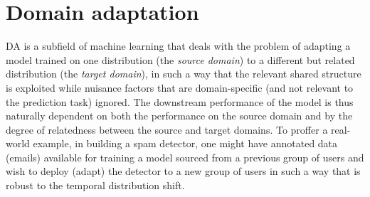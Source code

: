 \section{Domain adaptation}\label{sec:domain-adaptation}
\Acf{DA} is a subfield of machine learning that deals with the problem of adapting a model trained
on one distribution (the \emph{source domain}) to a different but related distribution (the
\emph{target domain}), in such a way that the relevant shared structure is exploited while nuisance
factors that are domain-specific (and not relevant to the prediction task) ignored.
%
The downstream performance of the  model is thus naturally dependent on both the performance on the
source domain and by the degree of relatedness between the source and target domains.
%
To proffer a real-world example, in building a spam detector, one might have annotated data
(emails) available for training a model sourced from a previous group of users and wish to deploy
(adapt) the detector to a new group of users in such a way that is robust to the temporal
distribution shift.

